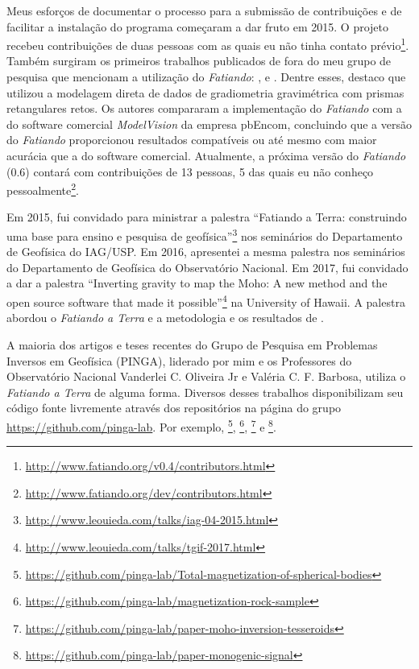 \documentclass[12pt,a4paper,oneside,titlepage,onecolumn]{article}
\begin{document}
Meus esforços de documentar o processo para a submissão de contribuições e de
facilitar a instalação do programa começaram a dar fruto em 2015.
O projeto recebeu contribuições de duas pessoas com as quais eu não tinha
contato prévio\footnote{\url{http://www.fatiando.org/v0.4/contributors.html}}.
Também surgiram os primeiros trabalhos publicados de fora do meu grupo de
pesquisa que mencionam a utilização do \textit{Fatiando}:
\citet{niccoli2015}, \citet{matthews2016} e \citet{bassett2016}.
Dentre esses, destaco \citet{matthews2016} que utilizou a modelagem direta de
dados de gradiometria gravimétrica com prismas retangulares retos.
Os autores compararam a implementação do \textit{Fatiando} com a do software
comercial \textit{ModelVision} da empresa pbEncom, concluindo que a versão do
\textit{Fatiando} proporcionou resultados compatíveis ou até mesmo com maior
acurácia que a do software comercial.
Atualmente, a próxima versão do \textit{Fatiando} (0.6) contará com
contribuições de 13 pessoas, 5 das quais eu não conheço
pessoalmente\footnote{\url{http://www.fatiando.org/dev/contributors.html}}.

Em 2015, fui convidado para ministrar a palestra ``Fatiando a Terra:
construindo uma base para ensino e pesquisa de
geofísica''\footnote{\url{http://www.leouieda.com/talks/iag-04-2015.html}} nos
seminários do Departamento de Geofísica do IAG/USP.
Em 2016, apresentei a mesma palestra nos seminários do Departamento de
Geofísica do Observatório Nacional.
Em 2017, fui convidado a dar a palestra ``Inverting gravity to map the Moho: A
new method and the open source software that made it
possible''\footnote{\url{http://www.leouieda.com/talks/tgif-2017.html}}
na University of Hawaii.
A palestra abordou o \textit{Fatiando a Terra} e a metodologia e os resultados
de \citet{moho}.

A maioria dos artigos e teses recentes do Grupo de Pesquisa em Problemas
Inversos em Geofísica (PINGA), liderado por mim e os Professores do
Observatório Nacional
Vanderlei C. Oliveira Jr e Valéria C. F. Barbosa,
utiliza o \textit{Fatiando a Terra} de alguma forma.
Diversos desses trabalhos disponibilizam seu código fonte livremente através
dos repositórios na página do grupo \url{https://github.com/pinga-lab}.
Por exemplo,
\citet{magdir}\footnote{\url{https://github.com/pinga-lab/Total-magnetization-of-spherical-bodies}},
\citet{reis2016}\footnote{\url{https://github.com/pinga-lab/magnetization-rock-sample}},
\citet{moho}\footnote{\url{https://github.com/pinga-lab/paper-moho-inversion-tesseroids}}
e
\citet{monogenic2017}\footnote{\url{https://github.com/pinga-lab/paper-monogenic-signal}}.
\end{document}
